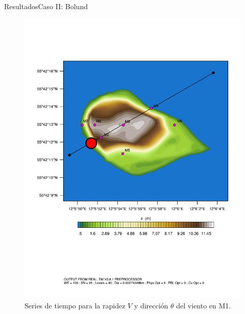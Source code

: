 \documentclass[mathserif,10pt]{beamer}
\begin{document}
\begin{frame}{Resultados}{Caso II: Bolund}
\begin{figure}[H]
\begin{minipage}{0.35\linewidth}
			\includegraphics[width=1\linewidth,page=1,trim={3.5cm 9.3cm 0.8cm 3.8cm},clip]{fig/05/ppt/bol_control_point1.pdf}%
		\end{minipage}%
		\vspace{-2mm}\caption{Series de tiempo para la rapidez $V$ y dirección $\theta$ del viento en M1.}
		\label{fig:06_bol_ts_m1}
	\end{figure}
\end{frame}
\end{document}
